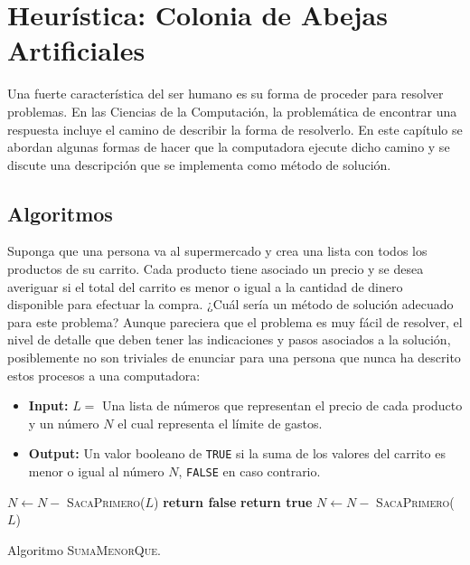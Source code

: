 \chapter{Heurística: Colonia de Abejas Artificiales}

Una fuerte característica del ser humano es su forma de proceder 
para resolver problemas. En las Ciencias de la Computación, 
la problemática de encontrar una respuesta incluye el camino de 
describir la forma de resolverlo. En este capítulo se abordan algunas formas de 
hacer que la computadora ejecute dicho camino y se discute una descripción 
que se implementa como método de solución.

\section{Algoritmos}

Suponga que una persona va al supermercado y crea una lista con todos los
productos de su carrito. Cada producto tiene asociado un precio y se desea
averiguar si el total del carrito es menor o igual a la cantidad de dinero
disponible para efectuar la compra. ¿Cuál sería un método de solución
adecuado para este problema? Aunque pareciera que el problema es muy fácil
de resolver, el nivel de detalle que deben tener las indicaciones y pasos asociados a
la solución, posiblemente no son triviales de enunciar para una persona que nunca
ha descrito estos procesos a una computadora:

\begin{itemize}

\item \textbf{Input:} $L = $ Una lista de números que representan el precio de
  cada producto y un número $N$ el cual representa el límite de gastos.

\item \textbf{Output:} Un valor booleano de \texttt{TRUE} si la suma de los
  valores del carrito es menor o igual al número $N$, \texttt{FALSE} en caso
  contrario.

\end{itemize}

\begin{algorithm}
  \begin{algorithmic}[1]
      \State $N \leftarrow N -$ \textsc{SacaPrimero}($L$)
          \State \textbf{return false}
        \EndIf
          \State \textbf{return true}
        \EndIf
        \State $N \leftarrow N -$ \textsc{SacaPrimero}($L$)
      \EndWhile
    \EndProcedure
  \end{algorithmic}
  \caption{Algoritmo \textsc{SumaMenorQue}.}
  \label{code:algoritmo}
\end{algorithm}

